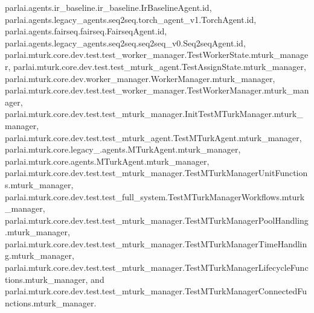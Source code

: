 parlai.\+agents.\+ir\+\_\+baseline.\+ir\+\_\+baseline.\+Ir\+Baseline\+Agent.\+id, parlai.\+agents.\+legacy\+\_\+agents.\+seq2seq.\+torch\+\_\+agent\+\_\+v1.\+Torch\+Agent.\+id, parlai.\+agents.\+fairseq.\+fairseq.\+Fairseq\+Agent.\+id, parlai.\+agents.\+legacy\+\_\+agents.\+seq2seq.\+seq2seq\+\_\+v0.\+Seq2seq\+Agent.\+id, parlai.\+mturk.\+core.\+dev.\+test.\+test\+\_\+worker\+\_\+manager.\+Test\+Worker\+State.\+mturk\+\_\+manager, parlai.\+mturk.\+core.\+dev.\+test.\+test\+\_\+mturk\+\_\+agent.\+Test\+Assign\+State.\+mturk\+\_\+manager, parlai.\+mturk.\+core.\+dev.\+worker\+\_\+manager.\+Worker\+Manager.\+mturk\+\_\+manager, parlai.\+mturk.\+core.\+dev.\+test.\+test\+\_\+worker\+\_\+manager.\+Test\+Worker\+Manager.\+mturk\+\_\+manager, parlai.\+mturk.\+core.\+dev.\+test.\+test\+\_\+mturk\+\_\+manager.\+Init\+Test\+M\+Turk\+Manager.\+mturk\+\_\+manager, parlai.\+mturk.\+core.\+dev.\+test.\+test\+\_\+mturk\+\_\+agent.\+Test\+M\+Turk\+Agent.\+mturk\+\_\+manager, parlai.\+mturk.\+core.\+legacy\+\_.\+agents.\+M\+Turk\+Agent.\+mturk\+\_\+manager, parlai.\+mturk.\+core.\+agents.\+M\+Turk\+Agent.\+mturk\+\_\+manager, parlai.\+mturk.\+core.\+dev.\+test.\+test\+\_\+mturk\+\_\+manager.\+Test\+M\+Turk\+Manager\+Unit\+Functions.\+mturk\+\_\+manager, parlai.\+mturk.\+core.\+dev.\+test.\+test\+\_\+full\+\_\+system.\+Test\+M\+Turk\+Manager\+Workflows.\+mturk\+\_\+manager, parlai.\+mturk.\+core.\+dev.\+test.\+test\+\_\+mturk\+\_\+manager.\+Test\+M\+Turk\+Manager\+Pool\+Handling.\+mturk\+\_\+manager, parlai.\+mturk.\+core.\+dev.\+test.\+test\+\_\+mturk\+\_\+manager.\+Test\+M\+Turk\+Manager\+Time\+Handling.\+mturk\+\_\+manager, parlai.\+mturk.\+core.\+dev.\+test.\+test\+\_\+mturk\+\_\+manager.\+Test\+M\+Turk\+Manager\+Lifecycle\+Functions.\+mturk\+\_\+manager, and parlai.\+mturk.\+core.\+dev.\+test.\+test\+\_\+mturk\+\_\+manager.\+Test\+M\+Turk\+Manager\+Connected\+Functions.\+mturk\+\_\+manager.

